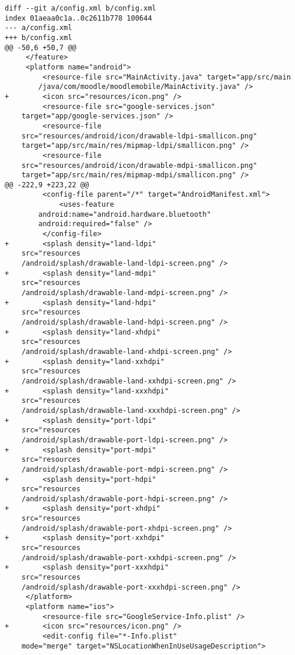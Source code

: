 \begin{lstlisting}[frame=single, label ={app-resource}, caption = Menggunakan \textit{resource} yang baru saja dihasilkan di dalam aplikasi ]
diff --git a/config.xml b/config.xml
index 01aeaa0c1a..0c2611b778 100644
--- a/config.xml
+++ b/config.xml
@@ -50,6 +50,7 @@
     </feature>
     <platform name="android">
         <resource-file src="MainActivity.java" target="app/src/main
		/java/com/moodle/moodlemobile/MainActivity.java" />
+        <icon src="resources/icon.png" />
         <resource-file src="google-services.json" 
	target="app/google-services.json" />
         <resource-file 
	src="resources/android/icon/drawable-ldpi-smallicon.png"
	target="app/src/main/res/mipmap-ldpi/smallicon.png" />
         <resource-file 
	src="resources/android/icon/drawable-mdpi-smallicon.png" 
	target="app/src/main/res/mipmap-mdpi/smallicon.png" />
@@ -222,9 +223,22 @@
         <config-file parent="/*" target="AndroidManifest.xml">
             <uses-feature 
		android:name="android.hardware.bluetooth"
		android:required="false" />
         </config-file>
+        <splash density="land-ldpi"
	src="resources
	/android/splash/drawable-land-ldpi-screen.png" />
+        <splash density="land-mdpi"
	src="resources
	/android/splash/drawable-land-mdpi-screen.png" />
+        <splash density="land-hdpi" 
	src="resources
	/android/splash/drawable-land-hdpi-screen.png" />
+        <splash density="land-xhdpi" 
	src="resources
	/android/splash/drawable-land-xhdpi-screen.png" />
+        <splash density="land-xxhdpi" 
	src="resources
	/android/splash/drawable-land-xxhdpi-screen.png" />
+        <splash density="land-xxxhdpi" 
	src="resources
	/android/splash/drawable-land-xxxhdpi-screen.png" />
+        <splash density="port-ldpi"
	src="resources
	/android/splash/drawable-port-ldpi-screen.png" />
+        <splash density="port-mdpi" 
	src="resources
	/android/splash/drawable-port-mdpi-screen.png" />
+        <splash density="port-hdpi" 
	src="resources
	/android/splash/drawable-port-hdpi-screen.png" />
+        <splash density="port-xhdpi" 
	src="resources
	/android/splash/drawable-port-xhdpi-screen.png" />
+        <splash density="port-xxhdpi" 
	src="resources
	/android/splash/drawable-port-xxhdpi-screen.png" />
+        <splash density="port-xxxhdpi" 
	src="resources
	/android/splash/drawable-port-xxxhdpi-screen.png" />
     </platform>
     <platform name="ios">
         <resource-file src="GoogleService-Info.plist" />
+        <icon src="resources/icon.png" />
         <edit-config file="*-Info.plist" 
	mode="merge" target="NSLocationWhenInUseUsageDescription">

\end{lstlisting}
